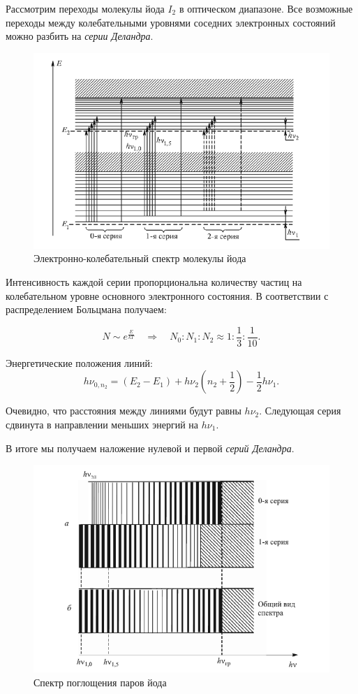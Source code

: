 \documentclass[a4paper, 12pt]{article}
\begin{document}
    Рассмотрим переходы молекулы йода $I_2$ в оптическом диапазоне. Все возможные переходы между колебательными уровнями соседних электронных состояний можно разбить на \textit{серии Деландра}.
    
    \begin{figure}[H]
        \centering
        \includegraphics[width = 0.6\linewidth]{images/delandr_series.png}
        \caption{Электронно-колебательный спектр молекулы йода}
        \label{fig:delandr_series}
    \end{figure}
    
    Интенсивность каждой серии пропорциональна количеству частиц на колебательном уровне основного электронного состояния. В соответствии с распределением Больцмана получаем:

    $$
    N \sim e^{\frac{E}{kT}} \quad \Rightarrow \quad N_0 : N_1 : N_2 \approx 1 : \frac{1}{3} : \frac{1}{10}. 
    $$

    Энергетические положения линий:
    \begin{equation}
        h \nu_{0, n_2} = (E_2 - E_1) + h \nu_2 (n_2 + \frac{1}{2}) - \frac{1}{2} h \nu_1.
        \label{eq:lines}
    \end{equation}

    Очевидно, что расстояния между линиями будут равны $h \nu_2$. Следующая серия сдвинута в направлении меньших энергий на $h \nu_1$.

    В итоге мы получаем наложение нулевой и первой \textit{серий Деландра}.

    \begin{figure}[H]
        \centering
        \includegraphics[width = 0.6\linewidth]{images/spectrum.png}
        \caption{Спектр поглощения паров йода}
        \label{fig:spectrum}
    \end{figure}
\end{document}
